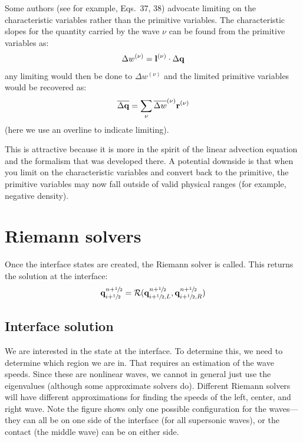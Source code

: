 Some authors (see for example, \cite{athena} Eqs.~37, 38) advocate
limiting on the characteristic variables rather than the primitive
variables.  The characteristic slopes for the quantity carried by the
wave $\nu$ can be found from the primitive variables
as: 
%
\begin{equation} 
\Delta w^{(\nu)} = {\bf l}^{(\nu)} \cdot \Delta {\bf q} 
\end{equation} 
%
any limiting would then be done to $\Delta w^{(\nu)}$ and the limited
primitive variables would be recovered as:
\begin{equation}
  \overline{\Delta {\bf q}} = \sum_\nu \overline{\Delta w}^{(\nu)}
  {\bf r}^{(\nu)} 
\end{equation} 
(here we use an overline to indicate limiting).

This is attractive because it is more in the spirit of the linear
advection equation and the formalism that was developed there.  A
potential downside is that when you limit on the characteristic
variables and convert back to the primitive, the primitive variables
may now fall outside of valid physical ranges (for example, negative
density).



\section{Riemann solvers}


Once the interface states are created, the Riemann solver is called.  This
returns the solution at the interface:
\begin{equation}
{\bf q}_{i+{\sfrac{1}{2}}}^{n+{\sfrac{1}{2}}} = \mathcal{R}({\bf q}_{i+{\sfrac{1}{2}},L}^{n+{\sfrac{1}{2}}}, {\bf q}_{i+{\sfrac{1}{2}},R}^{n+{\sfrac{1}{2}}})
\end{equation}

\subsection{Interface solution}

We are interested in the state at the interface.  To
determine this, we need to determine which region we are in.  That
requires an estimation of the wave speeds.  Since these are nonlinear
waves, we cannot in general just use the eigenvalues (although some
approximate solvers do).  Different Riemann solvers will have
different approximations for finding the speeds of the left, center,
and right wave.  Note the figure shows only one possible configuration
for the waves---they can all be on one side of the interface (for
all supersonic waves), or the contact (the middle wave) can be on either
side.

